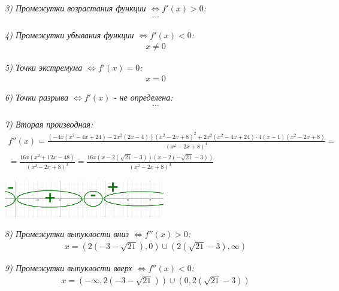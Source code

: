 \documentclass[a4paper,11pt]{article}
\begin{document}
\noindent \textsl{3) Промежутки возрастания функции   $\Longleftrightarrow f'(x) > 0 $:}
\begin{gather*}
\cdots
\end{gather*}

\noindent \textsl{4) Промежутки убывания функции   $\Longleftrightarrow f'(x) < 0 $:}
\begin{gather*}
x \neq 0
\end{gather*}

\noindent \textsl{5) Точки экстремума   $\Longleftrightarrow f'(x) = 0 $:}
\begin{align*}
x = 0
\end{align*}

\noindent \textsl{6) Точки разрыва $ \Longleftrightarrow f'(x) $  - не определена:}
\begin{align*}
\cdots
\end{align*}

\noindent \textsl{7) Вторая производная:}
\begin{gather*}	
f''(x) = \frac{(-4x(x^2 - 4x + 24) - 2x^2(2x - 4))(x^2 - 2x + 8)^2 + 2x^2(x^2 - 4x + 24) \cdot 4(x - 1)(x^2 - 2x + 8) }{(x^2 - 2x + 8)^4} = \\
= \frac{16x(x^2 + 12x - 48)}{(x^2 - 2x + 8)^3} = \frac{16x(x - 2( \sqrt{21} - 3))(x - 2( - \sqrt{21} - 3))}{(x^2 - 2x + 8)^3}
\end{gather*}

\begin{center}
	\includegraphics[width = 70mm]{images/713.png}
\end{center}
\noindent \textsl{8) Промежутки  выпуклости вниз $\Longleftrightarrow f''(x) > 0 $:}
\begin{gather*}
x = (2(-3 - \sqrt{21}), 0) \cup (2(\sqrt{21} - 3), \infty)
\end{gather*}

\noindent \textsl{9) Промежутки  выпуклости вверх $\Longleftrightarrow f''(x) < 0 $:}
\begin{gather*}
x = (-\infty, 2(-3 - \sqrt{21})) \cup (0, 2(\sqrt{21} - 3)) 
\end{gather*}
\end{document}
